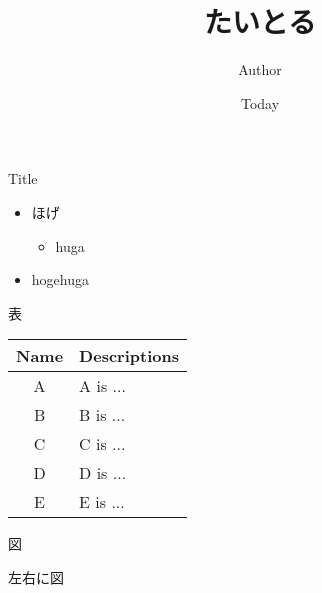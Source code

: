 \documentclass[14pt,dvipdfmx]{beamer}
\title{たいとる}
\author{Author}
\date{Today}
\begin{document}
\begin{frame}
\titlepage
\end{frame}

\begin{frame}
\begin{block}{Title}
\begin{itemize}
 \item ほげ
  \begin{itemize}
  \item huga
  \end{itemize}
 \item hogehuga
\end{itemize}
\end{block}
\end{frame}


\begin{frame}{表}
 \centering
 \begin{tabular}{c|l}
   Name & Descriptions \\ \hline
   A & A is ... \\ [2mm]
   B & B is ... \\ [2mm]
   C & C is ... \\ [2mm]
   D & D is ... \\ [2mm]
   E & E is ...
 \end{tabular}
\end{frame}


\begin{frame}{図}
  \centering
\end{frame}


\begin{frame}{左右に図}
 \begin{columns}[t]
 \end{columns}
\end{frame}
\end{document}
